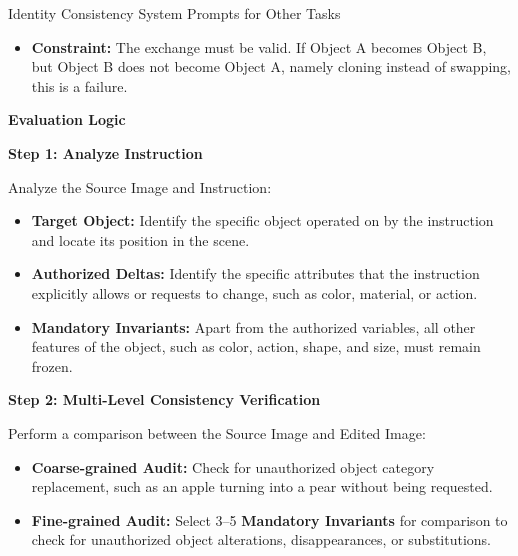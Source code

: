 \documentclass{llmxive}
\begin{document}
\begin{promptbox}[label={System Prompts: IC_Other_Tasks}]{Identity Consistency System Prompts for Other Tasks}
\begin{enumerate}[label=\arabic*., leftmargin=2.2em, labelsep=0.5em, itemsep=2pt]
    \begin{itemize}[leftmargin=2.2em, labelsep=0.5em, itemsep=2pt]
        \item \textbf{Constraint:} The exchange must be valid. If Object A becomes Object B, but Object B does not become Object A, namely cloning instead of swapping, this is a failure.
    \end{itemize}
\end{enumerate}

\medskip

\textbf{Evaluation Logic}

\medskip

\textbf{Step 1: Analyze Instruction}

Analyze the Source Image and Instruction:

\begin{itemize}[leftmargin=2.2em, labelsep=0.5em, itemsep=2pt]
    \item \textbf{Target Object:} Identify the specific object operated on by the instruction and locate its position in the scene.
    
    \item \textbf{Authorized Deltas:} Identify the specific attributes that the instruction explicitly allows or requests to change, such as color, material, or action.
    
    \item \textbf{Mandatory Invariants:} Apart from the authorized variables, all other features of the object, such as color, action, shape, and size, must remain frozen.
\end{itemize}

\medskip

\textbf{Step 2: Multi-Level Consistency Verification}

Perform a comparison between the Source Image and Edited Image:

\begin{itemize}[leftmargin=2.2em, labelsep=0.5em, itemsep=2pt]
    \item \textbf{Coarse-grained Audit:} Check for unauthorized object category replacement, such as an apple turning into a pear without being requested.
    
    \item \textbf{Fine-grained Audit:} Select 3--5 \textbf{Mandatory Invariants} for comparison to check for unauthorized object alterations, disappearances, or substitutions.
\end{itemize}


\end{promptbox}
\end{document}
